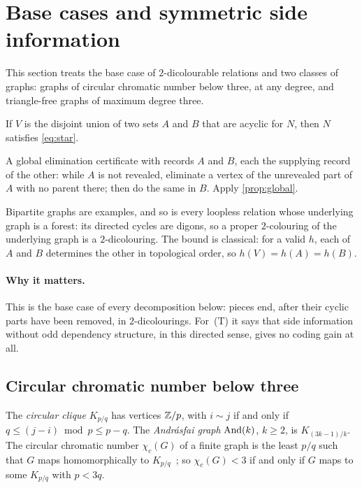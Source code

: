 \section{Base cases and symmetric side information}\label{sec:undirected}

This section treats the base case of $2$-dicolourable relations and two classes of graphs: graphs of circular chromatic
number below three, at any degree, and triangle-free graphs of maximum degree three.

\begin{proposition}\label{prop:twoAcyclic}
If $V$ is the disjoint union of two sets $A$ and $B$ that are acyclic for $N$, then $N$ satisfies \eqref{eq:star}.
\end{proposition}

\begin{outline}
A global elimination certificate with records $A$ and $B$, each the supplying record of the other: while $A$ is not
revealed, eliminate a vertex of the unrevealed part of $A$ with no parent there; then do the same in $B$. Apply
\cref{prop:global}.
\end{outline}

Bipartite graphs are examples, and so is every loopless relation whose underlying graph is a forest: its directed cycles are
digons, so a proper $2$-colouring of the underlying graph is a $2$-dicolouring. The bound is classical: for a valid $h$,
each of $A$ and $B$ determines the other in topological order, so $h(V)=h(A)=h(B)$.

\paragraph{Why it matters.} This is the base case of every decomposition below: pieces end, after their cyclic parts have
been removed, in $2$-dicolourings. For~(T) it says that side information without odd dependency structure, in this
directed sense, gives no coding gain at all.

\subsection{Circular chromatic number below three}\label{sec:circular}

The \emph{circular clique} $K_{p/q}$ has vertices $\mathbb{Z}/p$, with $i\sim j$ if and only if $q\le(j-i)\bmod p\le p-q$.
The \emph{Andrásfai graph} $\operatorname{And}(k)$, $k\ge2$, is $K_{(3k-1)/k}$. The circular chromatic number $\chi_c(G)$ of a finite
graph is the least $p/q$ such that $G$ maps homomorphically to $K_{p/q}$~\cite{Vince1988,Zhu2001}; so $\chi_c(G)<3$ if
and only if $G$ maps to some $K_{p/q}$ with $p<3q$.

